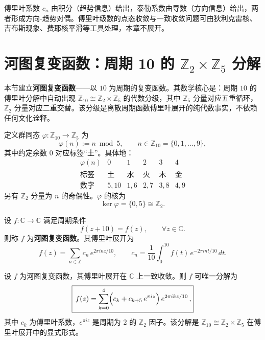 \begin{remark}\label{rem:fourier_coefficient_duality}
傅里叶系数 $c_n$ 由积分（趋势信息）给出，泰勒系数由导数（方向信息）给出，两者形成方向-趋势对偶。傅里叶级数的点态收敛与一致收敛问题可由狄利克雷核、吉布斯现象、费耶核平滑等工具处理，本章不展开。
\end{remark}

\section{\texorpdfstring{河图复变函数：周期 10 的 $\mathbb{Z}_2 \times \mathbb{Z}_5$ 分解}{河图复变函数}}
\label{sec:hetu_function}

本节建立\textbf{河图复变函数}——以 $10$ 为周期的复变函数。其数学核心是：周期 $10$ 的傅里叶分解中自动出现 $\mathbb{Z}_{10} \cong \mathbb{Z}_2 \times \mathbb{Z}_5$ 的代数分级，其中 $\mathbb{Z}_5$ 分量对应五重循环，$\mathbb{Z}_2$ 分量对应二重交替。该分级是离散周期函数傅里叶展开的纯代数事实，不依赖任何文化诠释。

\begin{definition}\label{def:hetu_mapping}
定义群同态 $\varphi: \mathbb{Z}_{10} \to \mathbb{Z}_5$ 为
\[
\varphi(n) := n \bmod 5, \qquad n \in \mathbb{Z}_{10} = \{0, 1, \dots, 9\},
\]
其中约定余数 $0$ 对应标签“土”。具体地：
\[
\begin{array}{c|ccccc}
\varphi(n) & 0 & 1 & 2 & 3 & 4 \\
\hline
\text{标签} & \text{土} & \text{水} & \text{火} & \text{木} & \text{金} \\
\text{数字} & 5, 10 & 1, 6 & 2, 7 & 3, 8 & 4, 9
\end{array}
\]
另有 $\mathbb{Z}_2$ 分量为 $n$ 的奇偶性。$\varphi$ 的核为
\[
\ker \varphi = \{0, 5\} \cong \mathbb{Z}_2.
\]
\end{definition}

\begin{definition}[河图复变函数]\label{def:hetu_function}
设 $f: \mathbb{C} \to \mathbb{C}$ 满足周期条件
\[
f(z + 10) = f(z), \qquad \forall z \in \mathbb{C}.
\]
则称 $f$ 为\textbf{河图复变函数}。其傅里叶展开为
\[
f(z) = \sum_{n \in \mathbb{Z}} c_n\, e^{2\pi i n z / 10}, \qquad c_n = \frac{1}{10}\int_0^{10} f(t)\, e^{-2\pi i n t / 10}\, dt.
\]
\end{definition}

\begin{theorem}\label{thm:hetu_fourier_decomposition}
设 $f$ 为河图复变函数，其傅里叶展开在 $\mathbb{C}$ 上一致收敛。则 $f$ 可唯一分解为
\[
\boxed{\,f(z) = \sum_{k=0}^{4} \Bigl( c_k + c_{k+5}\, e^{\pi i z} \Bigr)\, e^{2\pi i k z / 10}\,,}
\]
其中 $c_k$ 为傅里叶系数，$e^{\pi i z}$ 是周期为 $2$ 的 $\mathbb{Z}_2$ 因子。该分解是 $\mathbb{Z}_{10} \cong \mathbb{Z}_2 \times \mathbb{Z}_5$ 在傅里叶展开中的显式形式。
\end{theorem}


